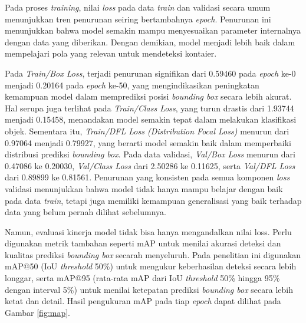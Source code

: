 Pada proses \textit{training}, nilai \textit{loss} pada data
\textit{train} dan validasi secara
umum menunjukkan tren penurunan seiring bertambahnya \textit{epoch}. Penurunan
ini menunjukkan bahwa model semakin mampu menyesuaikan parameter
internalnya dengan data yang diberikan. Dengan demikian, model
menjadi lebih baik dalam mempelajari pola yang relevan untuk
mendeteksi kontaier.

Pada \textit{Train/Box Loss}, terjadi penurunan signifikan dari 0.59460 pada
\textit{epoch} ke-0 menjadi 0.20164 pada \textit{epoch} ke-50, yang
mengindikasikan
peningkatan kemampuan model dalam memprediksi posisi \textit{bounding box}
secara lebih akurat. Hal serupa juga terlihat pada \textit{Train/Class Loss},
yang turun drastis dari 1.93744 menjadi 0.15458, menandakan model
semakin tepat dalam melakukan klasifikasi objek. Sementara itu,
\textit{Train/DFL Loss (Distribution Focal Loss)} menurun dari 0.97064 menjadi
0.79927, yang berarti model semakin baik dalam memperbaiki distribusi
prediksi \textit{bounding box}. Pada data validasi, \textit{Val/Box
Loss} menurun dari
0.47086 ke 0.20030, \textit{Val/Class Loss} dari 2.50286 ke 0.11625, serta
\textit{Val/DFL Loss} dari 0.89899 ke 0.81561. Penurunan yang konsisten pada
semua komponen \textit{loss} validasi menunjukkan bahwa model tidak hanya
mampu belajar dengan baik pada data \textit{train}, tetapi juga memiliki
kemampuan generalisasi yang baik terhadap data yang belum pernah
dilihat sebelumnya.

Namun, evaluasi kinerja model tidak bisa hanya mengandalkan nilai
loss. Perlu digunakan metrik tambahan seperti mAP  untuk menilai
akurasi deteksi dan kualitas prediksi \textit{bounding box} secarah
menyeluruh. Pada penelitian ini digunakan mAP@50 (IoU \textit{threshold} 50\%)
untuk mengukur keberhasilan deteksi secara lebih longgar, serta
mAP@95 (rata-rata mAP dari IoU \textit{threshold} 50\% hingga 95\% dengan
interval 5\%) untuk menilai ketepatan prediksi \textit{bounding box} secara
lebih ketat dan detail. Hasil pengukuran mAP pada tiap \textit{epoch} dapat
dilihat pada Gambar \ref{fig:map}.


